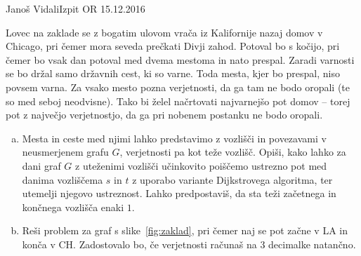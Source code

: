 \begin{naloga}{Janoš Vidali}{Izpit OR 15.12.2016}
\begin{vprasanje}
Lovec na zaklade se z bogatim ulovom
vrača iz Kalifornije nazaj domov v Chicago,
pri čemer mora seveda prečkati Divji zahod.
Potoval bo s kočijo,
pri čemer bo vsak dan potoval med dvema mestoma in nato prespal.
Zaradi varnosti se bo držal samo državnih cest, ki so varne.
Toda mesta, kjer bo prespal, niso povsem varna.
Za vsako mesto pozna verjetnosti,
da ga tam ne bodo oropali (te so med seboj neodvisne).
Tako bi želel načrtovati najvarnejšo pot domov
-- torej pot z največjo verjetnostjo,
da ga pri nobenem postanku ne bodo oropali.

\begin{enumerate}[(a)]
\item Mesta in ceste med njimi lahko predstavimo z vozlišči in povezavami
v ne\-usme\-rje\-nem grafu $G$, verjetnosti pa kot teže vozlišč.
Opiši, kako lahko za dani graf $G$ z uteženimi vozlišči
učinkovito poiščemo ustrezno pot med danima vozliščema $s$ in $t$
z uporabo variante Dijkstrovega algoritma,
ter utemelji njegovo ustreznost.
Lahko predpostaviš, da sta teži začetnega in končnega vozlišča enaki $1$.

\item Reši problem za graf s slike~\ref{fig:zaklad},
pri čemer naj se pot začne v LA in konča v CH.
Zadostovalo bo, če verjetnosti računaš na $3$ decimalke natančno.
\end{enumerate}

\begin{figure}
\centering
{}
\end{figure}
\end{vprasanje}
\end{naloga}
